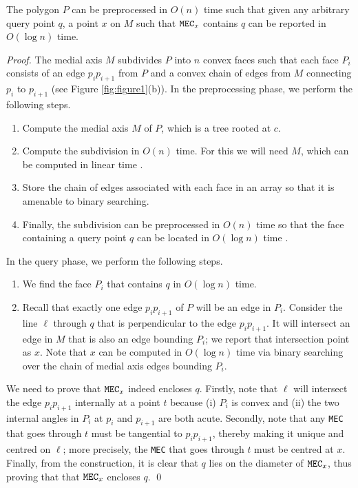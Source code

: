 \documentclass[12pt]{llncs}
\begin{document}
\begin{lemma}\label{llx}
The polygon $P$ can be preprocessed in $O(n)$ time such that given any
arbitrary query point $q$, a point $x$ on $M$ such that ${\tt MEC}_x$ contains $q$ 
can be 
reported in $O(\log n)$ time. 
\end{lemma}
\begin{proof}
The medial axis $M$ subdivides  $P$ into $n$ convex faces 
such that each face $P_i$ consists of an edge $p_ip_{i+1}$ from $P$
and a convex chain of edges from $M$ connecting $p_i$ to $p_{i+1}$ (see Figure 
\ref{fig:figure1}(b)). In the preprocessing phase, we perform the following steps.
\begin{enumerate}
\item Compute the medial axis $M$ of $P$, which is a tree rooted at $c$.
\item Compute the subdivision  in $O(n)$ time. For this we will need $M$, which 
can be computed in linear time \cite{CSW99}. 
\item Store the chain of edges associated with each face in an array so that it is 
amenable to binary searching.
\item Finally, the subdivision can be 
preprocessed in $O(n)$ time so that the face containing a query point 
$q$ can be located in $O(\log n)$ time \cite{Krik83}.  
\end{enumerate}
 
In the query phase, we perform the following steps.
\begin{enumerate}
\item  We find the face $P_i$ that contains $q$ in $O(\log n)$ time. 

\item Recall that exactly one edge
$p_i p_{i+1}$ of $P$ will be an edge in $P_i$.  Consider the line $\ell$ through $q$ 
that is perpendicular to the edge $p_i p_{i+1}$. It will intersect an edge in $M$ that is 
also an edge bounding $P_i$;  we report that intersection point 
as $x$. Note that $x$ can be computed in $O(\log n)$ time via binary searching over the chain of medial axis edges bounding $P_i$.
\end{enumerate}
We need to  prove that ${\tt MEC}_x$ indeed encloses $q$.  Firstly, note that $\ell$ 
will  intersect the edge $p_i p_{i+1}$ internally at a point $t$ because (i) $P_i$ is 
convex and (ii) the two internal angles in $P_i$ at $p_i$ and $p_{i+1}$ are both acute.  
Secondly, note that any {\tt MEC} that goes through $t$ must be tangential to $p_i 
p_{i+1}$, thereby making it unique and centred on $\ell$; more precisely, the {\tt MEC} 
that goes through $t$ must be centred at $x$. Finally, from the construction, it is clear 
that $q$ lies on the diameter of  ${\tt MEC}_x$, thus proving that that ${\tt MEC}_x$ 
encloses $q$. 
\qed
\end{proof}
\end{document}
